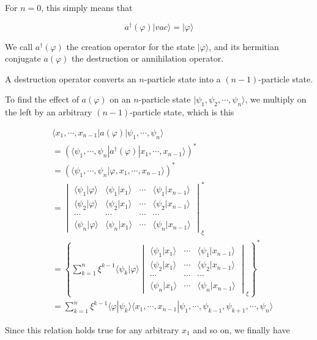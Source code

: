 For $n=0$, this simply means that

\[a^\dagger(\varphi)|vac\rangle = |\varphi\rangle \]

We call $a^\dagger(\varphi)$ the creation operator for the state $|\varphi\rangle$, and its hermitian conjugate $a(\varphi)$ the destruction or annihilation operator. 

A destruction operator converts an $n$-particle state into a $(n-1)$-particle state. 

To find the effect of $a(\varphi)$ on an $n$-particle state $|\psi_1,\psi_2,\cdots,\psi_n\rangle$, we multiply on the left by an arbitrary $(n-1)$-particle state, which is this

\[\begin{split}
&\langle x_1,\cdots,x_{n-1}|a(\varphi)|\psi_1,\cdots,\psi_n\rangle \\
&= (\langle \psi_1,\cdots,\psi_n|a^\dagger(\varphi)|x_1,\cdots,x_{n-1}\rangle)^*\\
&= (\langle \psi_1,\cdots,\psi_n|\varphi,x_1,\cdots,x_{n-1}\rangle)^*\\
&= 
\begin{vmatrix}
\langle\psi_1|\varphi\rangle & \langle\psi_1|x_1\rangle & \cdots & \langle\psi_1|x_{n-1}\rangle\\
\langle\psi_2|\varphi\rangle & \langle\psi_2|x_1\rangle & \cdots & \langle\psi_2|x_{n-1}\rangle\\
\cdots & \cdots & \cdots & \cdots \\
\langle\psi_n|\varphi\rangle & \langle\psi_n|x_1\rangle & \cdots & \langle\psi_n|x_{n-1}\rangle
\end{vmatrix}_{\xi}^*\\
&= \left\{\sum_{k=1}^n \xi^{k-1}\langle\psi_k|\varphi\rangle
\begin{vmatrix}
 \langle\psi_1|x_1\rangle & \cdots & \langle\psi_1|x_{n-1}\rangle\\
 \langle\psi_2|x_1\rangle & \cdots & \langle\psi_2|x_{n-1}\rangle\\
 \cdots & \cdots & \cdots \\
 \langle\psi_n|x_1\rangle & \cdots & \langle\psi_n|x_{n-1}\rangle
\end{vmatrix}_{\xi} \right\}^*\\
&= \sum_{k=1}^n \xi^{k-1}\langle\varphi|\psi_k\rangle\langle x_1,\cdots,x_{n-1}|\psi_1,\cdots,\psi_{k-1},\psi_{k+1},\cdots,\psi_n\rangle
\end{split}\]

Since this relation holds true for any arbitrary $x_1$ and so on, we finally have

